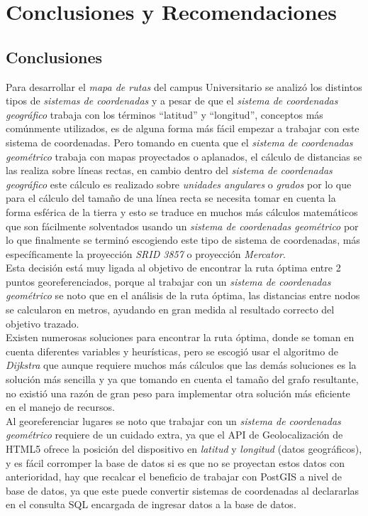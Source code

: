 
\chapter{Conclusiones y Recomendaciones}

\section{Conclusiones}


Para desarrollar el \emph{mapa de rutas} del campus Universitario se analizó
los distintos tipos de \emph{sistemas de coordenadas} y a pesar de que el \emph{sistema de coordenadas geográfico} trabaja con los términos ``latitud'' y ``longitud'', conceptos más comúnmente utilizados, es de alguna forma más fácil empezar a trabajar con este sistema de coordenadas. Pero tomando en cuenta que el \emph{sistema de coordenadas geométrico} trabaja con mapas proyectados o aplanados, el cálculo de distancias se las realiza sobre líneas rectas, en cambio dentro del \emph{sistema de coordenadas geográfico} este cálculo es realizado sobre \emph{unidades angulares} o \emph{grados} por lo que para el cálculo del tamaño de una línea recta se necesita tomar en cuenta la forma esférica de la tierra y esto se traduce en muchos más cálculos matemáticos que son fácilmente solventados usando un \emph{sistema de coordenadas geométrico} por lo que finalmente se terminó escogiendo este tipo de sistema de coordenadas, más específicamente la proyección \emph{SRID 3857} o proyección \emph{Mercator}. \\

Esta decisión está muy ligada al objetivo de encontrar la ruta óptima entre 2 puntos georeferenciados, porque al trabajar con un  \emph{sistema de coordenadas geométrico} se noto que en el análisis de la ruta óptima, las distancias entre nodos se calcularon en metros, ayudando en gran medida al resultado correcto del objetivo trazado. \\

Existen numerosas soluciones para encontrar la ruta óptima, donde se toman en cuenta diferentes variables y heurísticas, pero se escogió usar el algoritmo de \emph{Dijkstra} que aunque  requiere muchos más cálculos que las demás soluciones es la solución más sencilla y ya que tomando en cuenta el tamaño del grafo resultante, no existió una razón de gran peso para implementar otra solución más eficiente en el manejo de recursos.\\

Al georeferenciar lugares se noto que trabajar con un \emph{sistema de coordenadas geométrico} requiere de un cuidado extra, ya que el API de Geolocalización de HTML5 ofrece la posición del dispositivo en \emph{latitud} y \emph{longitud} (datos geográficos), y es fácil corromper la base de datos si es que no se proyectan estos datos con anterioridad, hay que recalcar el beneficio de trabajar con  PostGIS a nivel de base de datos, ya que este puede convertir sistemas de coordenadas al declararlas en el consulta SQL encargada de ingresar datos a la base de datos. \\

